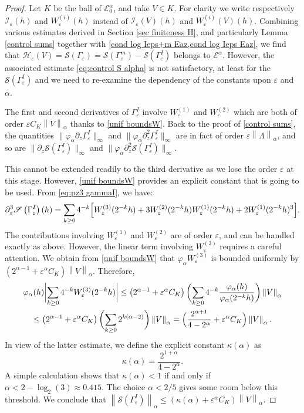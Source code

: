 \documentclass[10pt]{amsart}
\let\mathcal\mathscr
\newcommand{\cI}{\mathcal{I}}
\newcommand{\cS}{\mathcal{S}}
\theoremstyle{plain}
\theoremstyle{definition}
\renewcommand{\H}{\mathcal{H}_\eps}
\let\eps\varepsilon
\newcommand{\bbabs}[1]{\biggl\lvert#1\biggr\rvert}
\newcommand{\nalph}[1]{\left\lVert#1\right\rVert_\alpha}
\newcommand{\Ea}{\mathcal{E}^\alpha}
\newcommand{\Eaz}{\mathcal{E}^\alpha_0}
\newcommand{\Gammam}{\Gamma^m_{\eps}}
\newcommand{\GammaI}{\Gamma^I_{\eps}}
\newcommand{\vphia}{\varphi_\alpha}
\begin{document}
\begin{proof}
Let $K$ be the ball of $\Eaz$, and take $V \in K$. For clarity we write respectively $\cI_\eps(h) $ and $W_\eps^{(i)}(h)$ instead of $\cI_\eps(V) (h)$ and $W_\eps^{(i)}(V) (h)$. Combining various estimates derived in Section \ref{sec finiteness H}, and particularly Lemma \ref{control sums} together with \cref{cond log Ieps+m Eaz,cond log Ieps Eaz}, we find that $ \H(V) = \cS(\Gamma_\eps) = \cS(\Gammam) - \cS(\GammaI)$ belongs to $\Ea$. However, the associated estimate \eqref{eq:control S alpha} is not satisfactory, at least for the $\cS(\GammaI)$ and we need to re-examine the dependency of the constants upon $\eps$ and $\alpha$.

The first and second derivatives of $\GammaI$ involve $W_\eps^{(1)}$ and $W_\eps^{(2)}$ which are both of order $\eps C_K \nalph{V}$ thanks to \cref{unif boundsW}. Back to the proof of \cref{control sums}, the quantities $\|\vphia\partial_z \GammaI\|_{\infty} $ and $\|\vphia\partial_z^2 \GammaI\|_{\infty} $ are in fact of order $\eps \nalph{\Lambda}$, and so are $\| \partial_z\cS(\GammaI)\|_{\infty} $ and $\| \vphia\partial_z^2\cS(\GammaI)\|_{\infty} $.

This cannot be extended readily to the third derivative as we lose the order $\eps$ at this stage. However, \cref{unif boundsW} provides an explicit constant that is going to be used. From \eqref{eq:pz3 gammaI}, we have:
\begin{equation*}
\partial^3_z \cS \left(\GammaI \right)(h) = \sum_{k \geq 0} 4^{-k} \Bigl[W_\eps^{(3)}(2^{-k}h)+3W_\eps^{(2)}(2^{-k}h)W_\eps^{(1)}(2^{-k}h)+2W_\eps^{(1)}(2^{-k}h)^3 \Bigr].
\end{equation*}
The contributions involving $W^{(1)}_\eps$ and $W^{(2)}_\eps$ are of order $\eps$, and can be handled exactly as above. However, the linear term involving $W_\eps^{(3)}$ requires a careful attention. We obtain from \cref{unif boundsW} that $\vphia W_\eps^{(3)}$ is bounded uniformly by $\left(2^{\alpha-1} + \eps^\alpha C_K \right) \nalph{V}$. Therefore,
\begin{multline}\label{eq:contraction kappa}
\vphia(h) \bbabs{ \sum_{k\geq 0} 4^{-k}W^{(3)}_\eps(2^{-k}h) }
\leq \left(2^{\alpha-1} + \eps^\alpha C_K \right) \biggl (\sum_{k \geq 0} 4^{-k} \dfrac{\vphia(h)}{\vphia(2^{-k}h)} \biggr) \nalph{V} \\
\leq
\left(2^{\alpha-1} + \eps^\alpha C_K \right) \biggl (\sum_{k \geq 0} 2^{k(\alpha - 2)} \biggr) \nalph{V} =
\Bigl(\dfrac{2^{\alpha+1}}{4 - 2^\alpha} + \eps^\alpha C_K \Bigr) \nalph{V}.
\end{multline}
In view of the latter estimate, we define the explicit constant $\kappa(\alpha)$ as
\begin{equation*}
\kappa(\alpha) = \dfrac{2^{1+\alpha}}{4-2^\alpha}.
\end{equation*}
A simple calculation shows that $\kappa(\alpha)<1$ if and only if $\alpha < 2 - \log_2(3) \approx 0.415$.
The choice $\alpha < 2/5$ gives some room below this threshold. We conclude that $\nalph{\cS(\GammaI)}\leq (\kappa(\alpha)+\eps^\alpha C_K)\nalph{V}$.


\end{proof}
\end{document}

